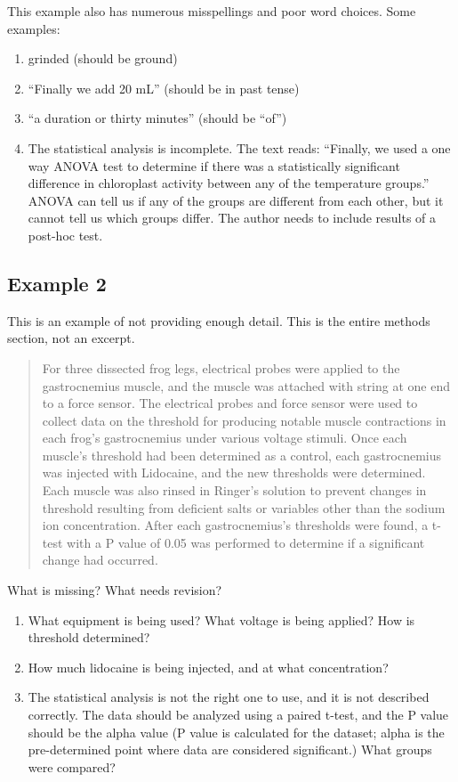 \documentclass[
]{book}
\providecommand{\tightlist}{%
  \setlength{\itemsep}{0pt}\setlength{\parskip}{0pt}}
\begin{document}
This example also has numerous misspellings and poor word choices. Some examples:

\begin{enumerate}
\def\labelenumi{\arabic{enumi}.}
\tightlist
\item
  grinded (should be ground)
\item
  ``Finally we add 20 mL'' (should be in past tense)
\item
  ``a duration or thirty minutes'' (should be ``of'')
\item
  The statistical analysis is incomplete. The text reads: ``Finally, we used a one way ANOVA test to determine if there was a statistically significant difference in chloroplast activity between any of the temperature groups.'' ANOVA can tell us if any of the groups are different from each other, but it cannot tell us which groups differ. The author needs to include results of a post-hoc test.
\end{enumerate}

\hypertarget{example-2-4}{%
\subsection{Example 2}\label{example-2-4}}

This is an example of not providing enough detail. This is the entire methods section, not an excerpt.

\begin{quote}
For three dissected frog legs, electrical probes were applied to the gastrocnemius muscle, and the muscle was attached with string at one end to a force sensor. The electrical probes and force sensor were used to collect data on the threshold for producing notable muscle contractions in each frog's gastrocnemius under various voltage stimuli. Once each muscle's threshold had been determined as a control, each gastrocnemius was injected with Lidocaine, and the new thresholds were determined. Each muscle was also rinsed in Ringer's solution to prevent changes in threshold resulting from deficient salts or variables other than the sodium ion concentration. After each gastrocnemius's thresholds were found, a t-test with a P value of 0.05 was performed to determine if a significant change had occurred.
\end{quote}

What is missing? What needs revision?

\begin{enumerate}
\def\labelenumi{\arabic{enumi}.}
\tightlist
\item
  What equipment is being used? What voltage is being applied? How is threshold determined?
\item
  How much lidocaine is being injected, and at what concentration?
\item
  The statistical analysis is not the right one to use, and it is not described correctly. The data should be analyzed using a paired t-test, and the P value should be the alpha value (P value is calculated for the dataset; alpha is the pre-determined point where data are considered significant.) What groups were compared?
\end{enumerate}
\end{document}
